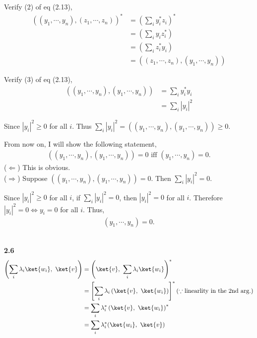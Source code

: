 \documentclass[10pt]{book}
\newcommand{\Textbf}[1]{\hspace{3mm}\\ \textbf{#1}\\}
\begin{document}
	
	Verify (2) of eq (2.13),
	\begin{equation}
			\begin{aligned}
			\left(
			(y_1, \cdots, y_n), (z_1, \cdots, z_n)
			\right)^*
			&= \left(\sum_i y_i^* z_i \right)^*\\
			&= \left(\sum_i y_i  z_i^* \right)\\
			&= \left(\sum_i z_i^* y_i \right)\\
			&= \left(
			(z_1, \cdots, z_n) , (y_1, \cdots, y_n)
			\right)
		\end{aligned}
	\end{equation}

	
	
	Verify (3) of eq (2.13),
	\begin{equation}
\begin{aligned}
		\left(
		(y_1, \cdots, y_n), (y_1, \cdots, y_n)
		\right)
		&= \sum_i y_i^* y_i\\
		&= \sum_i |y_i|^2
	\end{aligned}
\end{equation}
	
	Since $|y_i|^2 \geq 0$ for all $i$. Thus
	$\sum_i |y_i|^2 =
	\left(
	(y_1, \cdots, y_n), (y_1, \cdots, y_n)
	\right) \geq 0
	$.
	
	From now on,  I will show the following statement,
	\begin{equation}
\begin{aligned}
		\left(
		(y_1, \cdots, y_n), (y_1, \cdots, y_n)
		\right) = 0
		\text{ iff }  (y_1, \cdots, y_n) = 0.
	\end{aligned}
\end{equation}
	($\Leftarrow$) This is obvious.\\
	($\Rightarrow$)
	Suppose $\left( (y_1, \cdots, y_n), (y_1, \cdots, y_n) \right) = 0$. Then $\sum_i |y_i|^2 = 0$.
	
	Since $|y_i|^2 \geq 0$ for all $i$, if $\sum_i |y_i|^2 = 0$, then $|y_i|^2 = 0$ for all $i$.
	Therefore $|y_i|^2 = 0 \Leftrightarrow y_i = 0$  for all $i$.
	Thus,
	\begin{equation}
\begin{aligned}
		(y_1, \cdots, y_n) = 0.
	\end{aligned}
\end{equation}
	
	\Textbf{2.6}
	\begin{equation}
\begin{aligned}
		\left(\sum_i \lambda_i \ket{w_i},\ \ket{v}\right) &=
		\left(\ket{v},\ \sum_i \lambda_i \ket{w_i}\right)^*\\
		&= \left[\sum_i \lambda_i \left(\ket{v},\ \ket{w_i}  \right) \right]^* (\because \text{linearlity in the 2nd arg.})\\
		&= \sum_i \lambda_i^* \left(\ket{v},\ \ket{w_i} \right)^*\\
		&= \sum_i \lambda_i^* (\ket{w_i},\ \ket{v})
	\end{aligned}
\end{equation}
	
\end{document}
